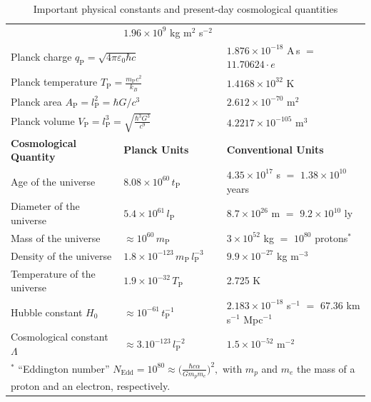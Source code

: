 \begin{table}[bth]
\begin{footnotesize}
\begin{tabular}{lll}
		& $1.96 \times 10^{9}$ kg m$^2$ s$^{-2}$
	\\
	\multicolumn{2}{l}{Planck charge $q_\mathrm{P} = \sqrt{4 \pi \varepsilon_0 \hbar c}$}
		& $1.876 \times 10^{-18}$ A\,s $=$ $11.70624 \cdot e$
	\\
	\multicolumn{2}{l}{Planck temperature $T_\mathrm{P} \displaystyle = \frac{m_\mathrm{P}c^2}{k_B}
		$}
		& $1.4168 \times 10^{32}$ K
	\\
	\multicolumn{2}{l}{Planck area $A_\mathrm{P} = l_\mathrm{P}^2 = \hbar G/c^3$}
		& $2.612 \times 10^{-70}$ m$^2$
	\\
	\multicolumn{2}{l}{Planck volume $V_\mathrm{P} = l_\mathrm{P}^3 = \displaystyle \sqrt{\frac{\hbar^3 G^3}{c^9}}$}
		& $4.2217 \times 10^{-105}$ m$^3$
	\\
	\hline
	\textbf{Cosmological Quantity} & \textbf{Planck Units} & \textbf{Conventional Units}
	\\ \hline
	Age of the universe
	& $8.08 \times 10^{60} \, t_\mathrm{P}$ 
	& $4.35 \times 10^{17}$ s $=$ $1.38 \times 10^{10}$ years
	\\
	Diameter of the universe
	& $5.4 \times 10^{61} \, l_\mathrm{P}$
	& $8.7 \times 10^{26}$ m $=$ $9.2 \times 10^{10}$ ly
	\\
	Mass of the universe
	& $\approx 10^{60} \, m_\mathrm{P}$
	& $3 \times 10^{52}$ kg $=$ %
	$10^{80}$ protons$^*$
	\\
	Density of the universe
	& $1.8 \times 10^{-123} \, m_\mathrm{P} \, l_\mathrm{P}^{-3}$
	& $9.9 \times 10^{-27}$ kg m$^{-3}$
	\\
	Temperature of the universe
	& $1.9 \times 10^{-32} \, T_\mathrm{P}$
	& 2.725 K
	\\
	Hubble constant $H_0$
	& $\approx 10^{-61} \, t_\mathrm{P}^{-1}$
	& $2.183 \times 10^{-18}$ s$^{-1}$ $=$ $67.36$ km s$^{-1}$ Mpc$^{-1}$
	\\
	Cosmological constant $\Lambda$
	& $\approx 3.10^{-123} \, l_\mathrm{P}^{-2}$
	& $1.5 \times 10^{-52}$ m$^{-2}$
	\\
	\hline
	\multicolumn{3}{l}{\scriptsize
		$^*$ “Eddington number”\index{Eddington number} 
		$
			N_{\mathrm{Edd}}
			= 10^{80}
			\approx \big(\frac{\hbar c \alpha}{G m_p m_e}\big)^2,
		$
		with $m_p$ and $m_e$ the mass of a proton and an electron, respectively.
	}
\end{tabular}
\end{footnotesize}
\caption{\label{tab:physical-constants}
	Important physical constants and present-day cosmological quantities
}
\end{table}

